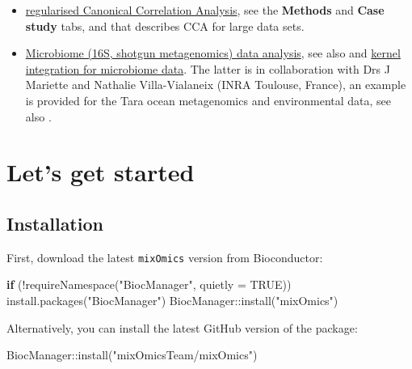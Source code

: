 \documentclass[
]{book}
\newenvironment{Shaded}{\begin{snugshade}}{\end{snugshade}}
\newcommand{\AttributeTok}[1]{\textcolor[rgb]{0.77,0.63,0.00}{#1}}
\newcommand{\ConstantTok}[1]{\textcolor[rgb]{0.00,0.00,0.00}{#1}}
\newcommand{\ControlFlowTok}[1]{\textcolor[rgb]{0.13,0.29,0.53}{\textbf{#1}}}
\newcommand{\FunctionTok}[1]{\textcolor[rgb]{0.00,0.00,0.00}{#1}}
\newcommand{\NormalTok}[1]{#1}
\newcommand{\SpecialCharTok}[1]{\textcolor[rgb]{0.00,0.00,0.00}{#1}}
\newcommand{\StringTok}[1]{\textcolor[rgb]{0.31,0.60,0.02}{#1}}
\begin{document}
\begin{itemize}
\item
  \href{http://www.mixOmics.org}{regularised Canonical Correlation Analysis}, see the \textbf{Methods} and \textbf{Case study} tabs, and \citep{Gon08} that describes CCA for large data sets.
\item
  \href{http://www.mixOmics.org/mixmc}{Microbiome (16S, shotgun metagenomics) data analysis}, see also \citep{Lec16} and \href{http://mixomics.org/mixkernel}{kernel integration for microbiome data}. The latter is in collaboration with Drs J Mariette and Nathalie Villa-Vialaneix (INRA Toulouse, France), an example is provided for the Tara ocean metagenomics and environmental data, see also \citep{Mar17}.
\end{itemize}

\hypertarget{02}{%
\chapter{Let's get started}\label{02}}

\hypertarget{02:install}{%
\section{Installation}\label{02:install}}

First, download the latest \texttt{mixOmics} version from Bioconductor:

\begin{Shaded}
\begin{Highlighting}[]
\ControlFlowTok{if}\NormalTok{ (}\SpecialCharTok{!}\FunctionTok{requireNamespace}\NormalTok{(}\StringTok{"BiocManager"}\NormalTok{, }\AttributeTok{quietly =} \ConstantTok{TRUE}\NormalTok{))}
    \FunctionTok{install.packages}\NormalTok{(}\StringTok{"BiocManager"}\NormalTok{)}
\NormalTok{ BiocManager}\SpecialCharTok{::}\FunctionTok{install}\NormalTok{(}\StringTok{"mixOmics"}\NormalTok{)}
\end{Highlighting}
\end{Shaded}

Alternatively, you can install the latest GitHub version of the package:

\begin{Shaded}
\begin{Highlighting}[]
\NormalTok{BiocManager}\SpecialCharTok{::}\FunctionTok{install}\NormalTok{(}\StringTok{"mixOmicsTeam/mixOmics"}\NormalTok{)}
\end{Highlighting}
\end{Shaded}
\end{document}
